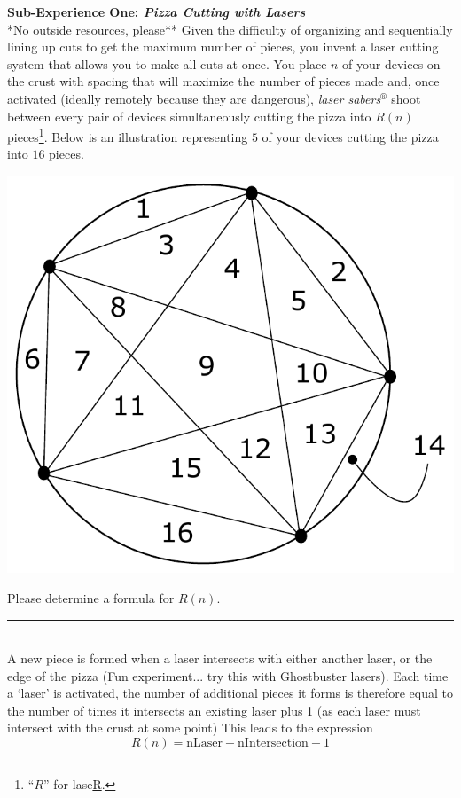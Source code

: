 \documentclass{article}
\newcommand{\statementsep}{\leavevmode\\[0.005in] \rule[\baselineskip/4]{\textwidth}{0.4pt}\leavevmode\\[0.005in]}
\begin{document}
\noindent \maltese \hspace{1ex} {\bf Sub-Experience One: \emph{Pizza Cutting with 
Lasers}}\\
\noindent **No outside resources, please**
    Given the difficulty of organizing and sequentially lining up cuts to get the 
maximum number of pieces, you invent a laser cutting system that allows you to make
all cuts at once.
    You place $n$ of your devices on the crust with spacing that will maximize the 
number of pieces made and, once activated (ideally remotely because they are 
dangerous), \emph{laser sabers}$^{\circledR}$ shoot between every pair of devices 
simultaneously cutting the pizza into $R(n)$ pieces\footnote{``$R$'' for lase\underline{R}.}.
    Below is an illustration representing $5$ of your devices cutting the pizza 
into $16$ pieces.
\begin{center}
\includegraphics[scale=0.5]{Figures/5pointsOnCircleEx}
\end{center}
\noindent Please determine a formula for $R(n)$.
\statementsep
A new piece is formed when a laser intersects with either another laser, or the edge of the pizza (Fun experiment... try this with Ghostbuster lasers). Each time a `laser' is activated, the number of additional pieces it forms is therefore equal to the number of times it intersects an existing laser plus 1 (as each laser must intersect with the crust at some point) This leads to the expression 
\begin{equation*}
R(n) = \text{nLaser} + \text{nIntersection} + 1
\end{equation*}
\end{document}
